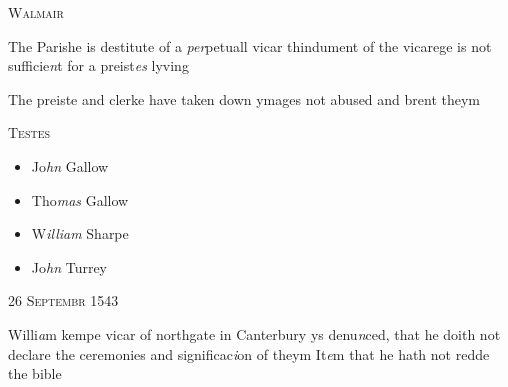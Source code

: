 \documentclass[12pt, a4paper]{book}
\begin{document}
				\marginpar[\vspace{0.5cm}{\textcolor{Gray}{n}}]{}
			
 

               
               	
				\begin{center}  {\scshape Walmair}  \end{center}
			
 
		\ifthenelse{\isodd{\thepage}}
		{\reversemarginpar}
		{\normalmarginpar}
		The Parishe is destitute of a \textit{per}petuall vicar
 thindument of the vicarege is not sufficie\textit{n}t for a
 	preist\textit{es} lyving
 
			
		\ifthenelse{\isodd{\thepage}}
		{\reversemarginpar}
		{\normalmarginpar}
		The preiste and clerke have taken down ymages
 not abused and brent theym

	\begin{center} {\scshape Testes} \end{center}\begin{itemize}
	
\item[]Jo\textit{hn} Gallow
	\item[]Tho\textit{mas} Gallow
		\item[]W\textit{illiam} Sharpe
		\item[]Jo\textit{hn} Turrey
	\end{itemize}

 

            
            
               
				\begin{center} \begin{large} {\scshape 
               	26 Septembr 1543
               } \end{large} \end{center}
			

	
				\marginpar[\vspace{0.5cm}{\textcolor{Gray}{ceremonies}}]{}
			
	
		\ifthenelse{\isodd{\thepage}}
		{\reversemarginpar}
		{\normalmarginpar}
		Willi\textit{a}m kempe vicar of northgate in Canterbury
 ys denu\textit{n}ced, that he doith not declare the ceremonies
 and significac\textit{i}on of theym
 It\textit{e}m that he hath not redde the bible
\end{document}
